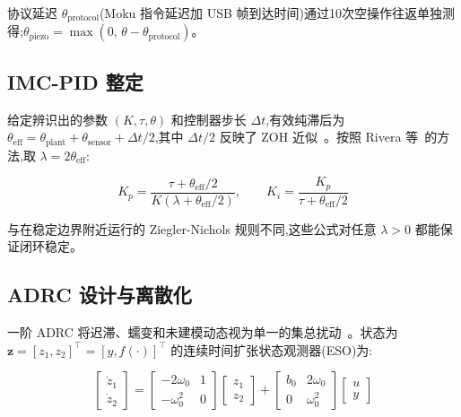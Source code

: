 \documentclass[fleqn,10pt]{wlscirep}
\begin{document}
协议延迟 $\theta_\text{protocol}$(Moku 指令延迟加 USB 帧到达时间)通过10次空操作往返单独测得;$\theta_\text{piezo} = \max(0,\,\theta - \theta_\text{protocol})$。

\subsection*{IMC-PID 整定}

给定辨识出的参数 $(K,\tau,\theta)$ 和控制器步长 $\Delta t$,有效纯滞后为 $\theta_\text{eff} = \theta_\text{plant} + \theta_\text{sensor} + \Delta t / 2$,其中 $\Delta t/2$ 反映了 ZOH 近似~\cite{astrom1995pid}。按照 Rivera 等~\cite{rivera1986imc}的方法,取 $\lambda = 2\theta_\text{eff}$:

\begin{equation}
K_p = \frac{\tau + \theta_\text{eff}/2}{K(\lambda + \theta_\text{eff}/2)}, \qquad K_i = \frac{K_p}{\tau + \theta_\text{eff}/2}
\label{eq:imc}
\end{equation}

与在稳定边界附近运行的 Ziegler-Nichols 规则不同,这些公式对任意 $\lambda > 0$ 都能保证闭环稳定。

\subsection*{ADRC 设计与离散化}

一阶 ADRC 将迟滞、蠕变和未建模动态视为单一的集总扰动~\cite{han2009adrc,gao2003adrc}。状态为 $\mathbf{z} = [z_1,z_2]^\top = [y, f(\cdot)]^\top$ 的连续时间扩张状态观测器(ESO)为:

\begin{equation}
\begin{bmatrix}\dot{z}_1 \\ \dot{z}_2\end{bmatrix}
= \begin{bmatrix}-2\omega_0 & 1 \\ -\omega_0^2 & 0\end{bmatrix}
\begin{bmatrix}z_1 \\ z_2\end{bmatrix}
+ \begin{bmatrix}b_0 & 2\omega_0 \\ 0 & \omega_0^2\end{bmatrix}
\begin{bmatrix}u \\ y\end{bmatrix}
\label{eq:eso}
\end{equation}
\end{document}
